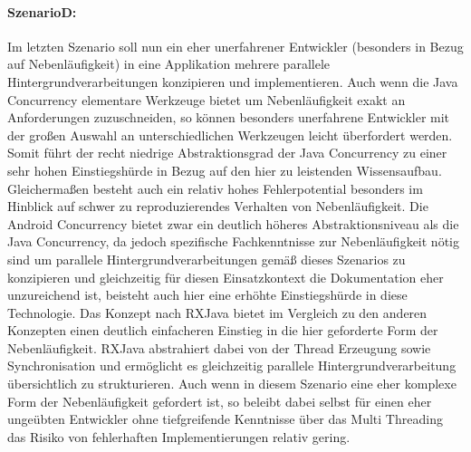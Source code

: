 \documentclass[12pt,oneside,a4paper,bibtotoc,liststotoc]{scrreprt}
\begin{document}
\paragraph{SzenarioD:}
Im letzten Szenario soll nun ein eher unerfahrener Entwickler (besonders in Bezug auf Nebenläufigkeit) in eine Applikation mehrere parallele Hintergrundverarbeitungen konzipieren und implementieren. Auch wenn die Java Concurrency elementare Werkzeuge bietet um Nebenläufigkeit exakt an Anforderungen zuzuschneiden, so können besonders unerfahrene Entwickler mit der großen Auswahl an unterschiedlichen Werkzeugen leicht überfordert werden.  Somit führt der recht niedrige Abstraktionsgrad der Java Concurrency zu einer sehr hohen Einstiegshürde in Bezug auf den hier zu leistenden Wissensaufbau. Gleichermaßen besteht auch ein relativ hohes Fehlerpotential besonders im Hinblick auf schwer zu reproduzierendes Verhalten von Nebenläufigkeit.
Die Android Concurrency bietet zwar ein deutlich höheres Abstraktionsniveau als die Java Concurrency, da jedoch spezifische Fachkenntnisse zur Nebenläufigkeit nötig sind um parallele Hintergrundverarbeitungen gemäß dieses Szenarios zu konzipieren und gleichzeitig für diesen Einsatzkontext die Dokumentation eher unzureichend ist, beisteht auch hier eine erhöhte Einstiegshürde in diese Technologie.
Das Konzept nach RXJava bietet im Vergleich zu den anderen Konzepten einen deutlich einfacheren Einstieg in die hier geforderte Form der Nebenläufigkeit. RXJava abstrahiert dabei von der Thread Erzeugung sowie Synchronisation und ermöglicht es gleichzeitig parallele Hintergrundverarbeitung übersichtlich zu strukturieren. Auch wenn in diesem Szenario eine eher komplexe Form der Nebenläufigkeit gefordert ist, so beleibt dabei selbst für einen eher ungeübten Entwickler ohne tiefgreifende Kenntnisse über das Multi Threading das Risiko von fehlerhaften Implementierungen relativ gering.\newline
\end{document}
